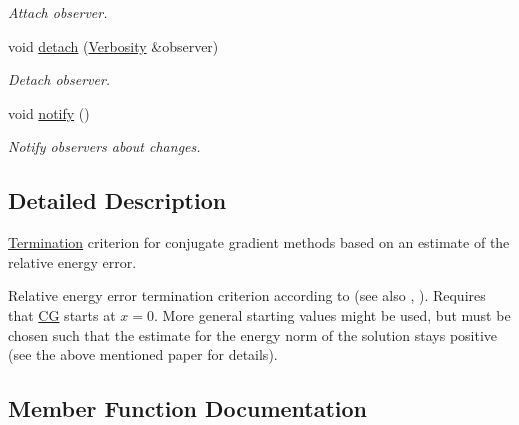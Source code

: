 \begin{DoxyCompactItemize}
\begin{DoxyCompactList}\small\item\em Attach observer. \end{DoxyCompactList}\item 
\hypertarget{classSpacy_1_1Mixin_1_1MixinConnection_adda739590c487679c26f60e50aedb73f}{}void \hyperlink{classSpacy_1_1Mixin_1_1MixinConnection_adda739590c487679c26f60e50aedb73f}{detach} (\hyperlink{classSpacy_1_1Mixin_1_1Verbosity_aefe2f237b0456c4bced001fbfa75f92e}{Verbosity} \&observer)\label{classSpacy_1_1Mixin_1_1MixinConnection_adda739590c487679c26f60e50aedb73f}

\begin{DoxyCompactList}\small\item\em Detach observer. \end{DoxyCompactList}\item 
\hypertarget{classSpacy_1_1Mixin_1_1MixinConnection_a1ddeaa78a3bb4a38c2cca36d1f99fe36}{}void \hyperlink{classSpacy_1_1Mixin_1_1MixinConnection_a1ddeaa78a3bb4a38c2cca36d1f99fe36}{notify} ()\label{classSpacy_1_1Mixin_1_1MixinConnection_a1ddeaa78a3bb4a38c2cca36d1f99fe36}

\begin{DoxyCompactList}\small\item\em Notify observers about changes. \end{DoxyCompactList}\end{DoxyCompactItemize}


\subsection{Detailed Description}
\hyperlink{namespaceSpacy_1_1CG_1_1Termination}{Termination} criterion for conjugate gradient methods based on an estimate of the relative energy error. 

Relative energy error termination criterion according to \cite{Strakos2005} (see also \cite{Hestenes1952}, \cite{Arioli2004}). Requires that \hyperlink{namespaceSpacy_1_1CG}{C\+G} starts at $ x = 0 $. More general starting values might be used, but must be chosen such that the estimate for the energy norm of the solution stays positive (see the above mentioned paper for details). 

\subsection{Member Function Documentation}
\hypertarget{classSpacy_1_1CG_1_1Termination_1_1StrakosTichyEnergyError_ac50987341731cbf4f97e32246099aaf9}{}
